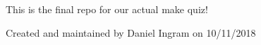 This is the final repo for our actual make quiz!

Created and maintained by Daniel Ingram on 10/11/2018 